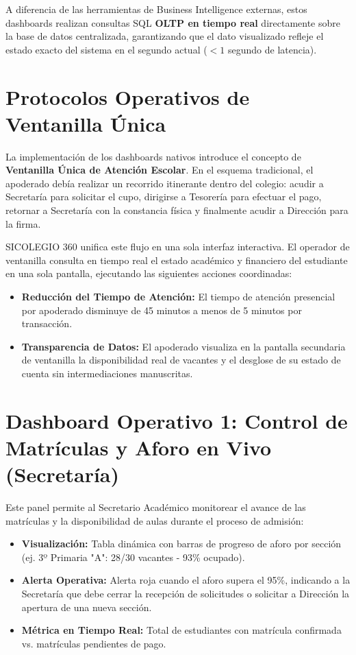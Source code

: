 \documentclass[12pt,a4paper,oneside]{report}
\begin{document}
A diferencia de las herramientas de Business Intelligence externas, estos dashboards realizan consultas SQL \textbf{OLTP en tiempo real} directamente sobre la base de datos centralizada, garantizando que el dato visualizado refleje el estado exacto del sistema en el segundo actual ($<1$ segundo de latencia).

\section{Protocolos Operativos de Ventanilla Única}

La implementación de los dashboards nativos introduce el concepto de \textbf{Ventanilla Única de Atención Escolar}. En el esquema tradicional, el apoderado debía realizar un recorrido itinerante dentro del colegio: acudir a Secretaría para solicitar el cupo, dirigirse a Tesorería para efectuar el pago, retornar a Secretaría con la constancia física y finalmente acudir a Dirección para la firma.

SICOLEGIO 360 unifica este flujo en una sola interfaz interactiva. El operador de ventanilla consulta en tiempo real el estado académico y financiero del estudiante en una sola pantalla, ejecutando las siguientes acciones coordinadas:
\begin{itemize}
    \item \textbf{Reducción del Tiempo de Atención:} El tiempo de atención presencial por apoderado disminuye de 45 minutos a menos de 5 minutos por transacción.
    \item \textbf{Transparencia de Datos:} El apoderado visualiza en la pantalla secundaria de ventanilla la disponibilidad real de vacantes y el desglose de su estado de cuenta sin intermediaciones manuscritas.
\end{itemize}

\section{Dashboard Operativo 1: Control de Matrículas y Aforo en Vivo (Secretaría)}

Este panel permite al Secretario Académico monitorear el avance de las matrículas y la disponibilidad de aulas durante el proceso de admisión:
\begin{itemize}
    \item \textbf{Visualización:} Tabla dinámica con barras de progreso de aforo por sección (ej. 3º Primaria "A": 28/30 vacantes - 93\% ocupado).
    \item \textbf{Alerta Operativa:} Alerta roja cuando el aforo supera el 95\%, indicando a la Secretaría que debe cerrar la recepción de solicitudes o solicitar a Dirección la apertura de una nueva sección.
    \item \textbf{Métrica en Tiempo Real:} Total de estudiantes con matrícula confirmada vs. matrículas pendientes de pago.
\end{itemize}
\end{document}
